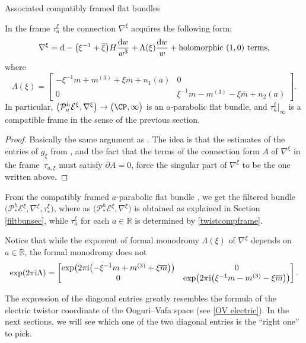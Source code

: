 \begin{subsubsection}{Associated compatibly framed flat bundles}
\begin{Proposition} In the frame $\tau_a^{\xi}$ the connection $\nabla^{\xi}$ acquires the following form:
\begin{equation}\label{singform}
 \nabla^{\xi}={\rm d}-\bigl(\xi^{-1}+\overline{\xi}\bigr)H\frac{{\rm d}w}{w^3}+\Lambda(\xi)\frac{{\rm d}w}{w}+ \text{holomorphic $(1,0)$ terms},
\end{equation}
where
\begin{equation}\label{expformon}
 \Lambda(\xi)=\begin{bmatrix}-\xi^{-1}m +m^{(3)}+\xi \overline{m} +n_1(a) & 0\\
 0& \xi^{-1}m -m^{(3)}-\xi \overline{m} +n_2(a)
 \end{bmatrix}.
\end{equation}
In particular, $\bigl(\mathcal{P}^h_a\mathcal{E}^{\xi},\nabla^{\xi}\bigr)\to \bigl(\CP,\infty\bigr)$ is an $a$-parabolic flat bundle, and $\tau_a^{\xi}|_{\infty}$ is a compatible frame in the sense of the previous section.

\begin{proof}
Basically the same argument as \cite[Sections 7 and 8]{BB04}. The idea is that the estimates of the entries of $g_{\xi}$ from \cite{BB04}, and the fact that the terms of the connection form $A$ of $\nabla^{\xi}$ in the frame~$\tau_{a,\xi}$ must satisfy $\overline{\partial}A=0$, force the singular part of $\nabla^{\xi}$ to be the one written above.
\end{proof}

\end{Proposition}
From the compatibly framed $a$-parabolic flat bundle , we get the filtered bundle~${\bigl(\mathcal{P}^h_*\mathcal{E}^{\xi},\nabla^{\xi},\tau_{*}^{\xi}\bigr)}$, where as $\bigl(\mathcal{P}^h_*\mathcal{E}^{\xi},\nabla^{\xi}\bigr)$ is obtained as explained in Section \ref{filtbunsec}, while $\tau_a^{\xi}$ for each $a\in \mathbb{R}$ is determined by \eqref{twistcompframe}.

Notice that while the exponent of formal monodromy $\Lambda(\xi)$ of $\nabla^{\xi}$ depends on $a\in \mathbb{R}$, the formal monodromy does not
\begin{equation*}
 \exp (2\pi {\rm i} \Lambda)=\begin{bmatrix} \exp \bigl(2 \pi {\rm i}\bigl(-\xi^{-1}m +m^{(3)}+\xi \overline{m}\bigr)\bigr) & 0\\
 0 & \exp \bigl(2\pi {\rm i}\bigl(\xi^{-1}m -m^{(3)}-\xi \overline{m}\bigr)\bigr)\\
 \end{bmatrix}.
\end{equation*}

The expression of the diagonal entries greatly resembles the formula of the electric twistor coordinate of the Ooguri--Vafa space (see \eqref{OV electric}). In the next sections, we will see which one of the two diagonal entries is the ``right one'' to pick.
\end{subsubsection}
